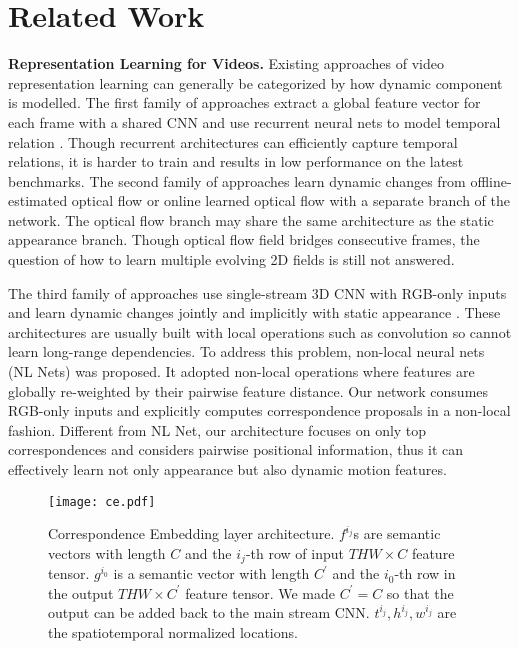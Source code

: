 \documentclass[10pt,twocolumn,letterpaper]{article}
\begin{document}
\section{Related Work}

\textbf{Representation Learning for Videos.} 
Existing approaches of video representation learning can generally be categorized by how dynamic component is modelled. The first family of approaches extract a global feature vector for each frame with a shared CNN and use recurrent neural nets to model temporal relation \cite{Long-Term:RCNN,Beyond:Short:Snippets}. Though recurrent architectures can efficiently capture temporal relations, 
it is harder to train and results in low performance on the latest benchmarks.
The second family of approaches learn dynamic changes from offline-estimated optical flow \cite{Two-stream:CNN,Two-stream:Fusion} or online learned optical flow \cite{TVLNet} with a separate branch of the network. The optical flow branch may share the same architecture as the static appearance branch. Though optical flow field bridges consecutive frames, the question of how to learn multiple evolving 2D fields is still not answered.

The third family of approaches use single-stream 3D CNN with RGB-only inputs and learn dynamic changes jointly and implicitly with static appearance \cite{C3D,I3D,Tran:ConvNet:search,Karpathy:Video:CNN,ARTNet,ECO}. These architectures are usually built with local operations such as convolution so cannot learn long-range dependencies. To address this problem, non-local neural nets (NL Nets) \cite{NLNet} was proposed. It adopted non-local operations where features are globally re-weighted by their pairwise feature distance. 
Our network consumes RGB-only inputs and explicitly computes correspondence proposals in a non-local fashion. Different from NL Net, our architecture focuses on only top correspondences and considers pairwise positional information, thus it can effectively learn not only appearance but also dynamic motion features.







\begin{figure*}[t]
\centering
\texttt{[image: ce.pdf]}
\caption{Correspondence Embedding layer architecture.  $f^{i_j}$s are semantic vectors with length $C$ and the $i_j$-th row of input  $THW\times C$  feature tensor. $g^{i_0}$ is a semantic vector with length $C^\prime$ and the $i_0$-th row in the output  $THW\times C^\prime$  feature tensor. We made $C^\prime=C$ so that the output can be added back to the main stream CNN.  $t^{i_j},h^{i_j},w^{i_j}$ are the spatiotemporal normalized locations.}
\label{fig:ce}
\vspace{-2ex}
\end{figure*}
\end{document}
